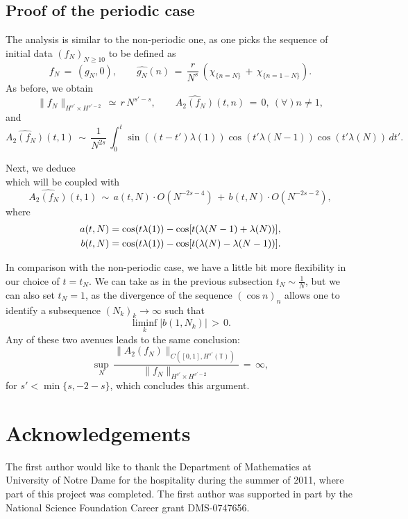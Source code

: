 \documentclass{amsart}
\begin{document}
\subsection{Proof of the periodic case} The analysis is similar to the non-periodic one, as one picks the sequence of initial data $(f_N)_{N\geq 10}$ to be defined as
\begin{equation}
f_N\,=\,(g_N, 0), \qquad \widehat{g_N}(n)\,=\,\frac{r}{N^s} \,\left(\chi_{\{n=N\}}\,+\,\chi_{\{n=1-N\}}\right).
\label{fnp}
\end{equation}
As before, we obtain
\[
\|f_N\|_{H^{s'}\times H^{s'-2}}\,\simeq\,r\,N^{s'-s}, \qquad \widehat{A_2(f_N)}(t,n)\,=\,0, \ (\forall) n \neq 1,\]
and
\[
\widehat{A_2(f_N)}(t,1)\,\sim\,\frac{1}{N^{2s}}\,\int_0^t \sin((t-t') \lambda(1))\cos(t' \lambda(N-1))\cos(t'\lambda(N))\,dt'.
\]

Next, we deduce
\[
\]
which will be coupled with
\[
\widehat{A_2(f_N)}(t,1)\,\sim\,a(t,N)\cdot O(N^{-2s-4})\,+\,b(t,N)\cdot O(N^{-2s-2}),
\]
where
\[\aligned
a(t,N)&= \cos (t\lambda(1))-\cos[t(\lambda(N-1) + \lambda(N))],\\ b(t,N)&= \cos (t\lambda(1))-\cos[t(\lambda(N) - \lambda(N-1))].
\endaligned
\]

In comparison with the non-periodic case, we have a little bit more flexibility in our choice of $t=t_N$. We can take as in the previous subsection $t_N \sim \frac{1}{N}$, but we can also set $t_N=1$, as the divergence of the sequence $(\cos n)_n$ allows one to identify a subsequence $(N_k)_k\to\infty$ such that 
\[
\liminf_k \left|b(1, N_k)\right|\,>\,0.
\]
Any of these two avenues leads to the same conclusion:
\[
\sup_N\,\frac{\|A_2(f_N)\|_{C([0,1], H^{s'}(\mathbb{T}))}}{\|f_N\|_{H^{s'}\times H^{s'-2}}}\,=\,\infty,\]
for $s'<\min\{s,-2-s\}$, which concludes this argument.

\section*{Acknowledgements}
The first author would like to thank the Department of Mathematics at University of Notre Dame for the hospitality during the summer of 2011, where part of this project was completed. The first author was supported in part by the National Science Foundation Career grant DMS-0747656.



\end{document}
